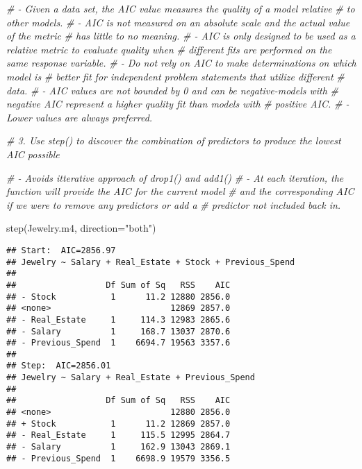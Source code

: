 \documentclass[
]{article}
\newenvironment{Shaded}{\begin{snugshade}}{\end{snugshade}}
\newcommand{\AttributeTok}[1]{\textcolor[rgb]{0.77,0.63,0.00}{#1}}
\newcommand{\CommentTok}[1]{\textcolor[rgb]{0.56,0.35,0.01}{\textit{#1}}}
\newcommand{\FunctionTok}[1]{\textcolor[rgb]{0.00,0.00,0.00}{#1}}
\newcommand{\NormalTok}[1]{#1}
\newcommand{\StringTok}[1]{\textcolor[rgb]{0.31,0.60,0.02}{#1}}
\begin{document}
\begin{Shaded}
\begin{Highlighting}[]
\CommentTok{\# {-} Given a data set, the AIC value measures the quality of a model relative }
\CommentTok{\#   to other models.}
\CommentTok{\# {-} AIC is not measured on an absolute scale and the actual value of the metric }
\CommentTok{\#   has little to no meaning.}
\CommentTok{\# {-} AIC is only designed to be used as a relative metric to evaluate quality when }
\CommentTok{\#   different fits are performed on the same response variable.}
\CommentTok{\# {-} Do not rely on AIC to make determinations on which model is }
\CommentTok{\#   better fit for independent problem statements that utilize different }
\CommentTok{\#   data.}
\CommentTok{\# {-} AIC values are not bounded by 0 and can be negative{-}models with }
\CommentTok{\#   negative AIC represent a higher quality fit than models with }
\CommentTok{\#   positive AIC.}
\CommentTok{\# {-} Lower values are always preferred.}


\CommentTok{\# 3. Use step() to discover the combination of predictors to produce the lowest AIC possible }
\end{Highlighting}
\end{Shaded}

\begin{Shaded}
\begin{Highlighting}[]
\CommentTok{\# {-} Avoids itterative approach of drop1() and add1()}
\CommentTok{\# {-} At each iteration, the function will provide the AIC for the current model }
\CommentTok{\#   and the corresponding AIC if we were to remove any predictors or add a }
\CommentTok{\#   predictor not included back in.}

\FunctionTok{step}\NormalTok{(Jewelry.m4, }\AttributeTok{direction=}\StringTok{"both"}\NormalTok{)}
\end{Highlighting}
\end{Shaded}

\begin{verbatim}
## Start:  AIC=2856.97
## Jewelry ~ Salary + Real_Estate + Stock + Previous_Spend
## 
##                  Df Sum of Sq   RSS    AIC
## - Stock           1      11.2 12880 2856.0
## <none>                        12869 2857.0
## - Real_Estate     1     114.3 12983 2865.6
## - Salary          1     168.7 13037 2870.6
## - Previous_Spend  1    6694.7 19563 3357.6
## 
## Step:  AIC=2856.01
## Jewelry ~ Salary + Real_Estate + Previous_Spend
## 
##                  Df Sum of Sq   RSS    AIC
## <none>                        12880 2856.0
## + Stock           1      11.2 12869 2857.0
## - Real_Estate     1     115.5 12995 2864.7
## - Salary          1     162.9 13043 2869.1
## - Previous_Spend  1    6698.9 19579 3356.5
\end{verbatim}
\end{document}
